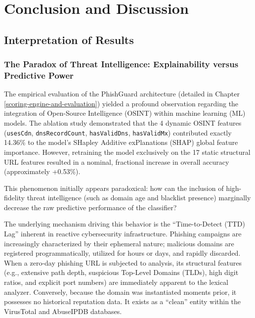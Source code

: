 \chapter{Conclusion and Discussion}
\label{conclusion-and-discussion}

\section{Interpretation of Results}

\subsection{The Paradox of Threat Intelligence: Explainability versus
Predictive
Power}\label{the-paradox-of-threat-intelligence-explainability-versus-predictive-power}

The empirical evaluation of the PhishGuard architecture (detailed in
Chapter \ref{scoring-engine-and-evaluation}) yielded a profound observation regarding the integration of
Open-Source Intelligence (OSINT) within machine learning (ML) models.
The ablation study demonstrated that the 4 dynamic OSINT features
(\texttt{usesCdn}, \texttt{dnsRecordCount}, \texttt{hasValidDns},
\texttt{hasValidMx}) contributed exactly 14.36\% to the model's SHapley
Additive exPlanations (SHAP) global feature importance. However,
retraining the model exclusively on the 17 static structural URL
features resulted in a nominal, fractional increase in overall accuracy
(approximately +0.53\%).

This phenomenon initially appears paradoxical: how can the inclusion of
high-fidelity threat intelligence (such as domain age and blacklist
presence) marginally decrease the raw predictive performance of the
classifier?

The underlying mechanism driving this behavior is the ``Time-to-Detect
(TTD) Lag'' inherent in reactive cybersecurity infrastructure. Phishing
campaigns are increasingly characterized by their ephemeral nature;
malicious domains are registered programmatically, utilized for hours or
days, and rapidly discarded. When a zero-day phishing URL is subjected
to analysis, its structural features (e.g., extensive path depth,
suspicious Top-Level Domains (TLDs), high digit ratios, and explicit
port numbers) are immediately apparent to the lexical analyzer.
Conversely, because the domain was instantiated moments prior, it
possesses no historical reputation data. It exists as a ``clean'' entity
within the VirusTotal and AbuseIPDB databases.

